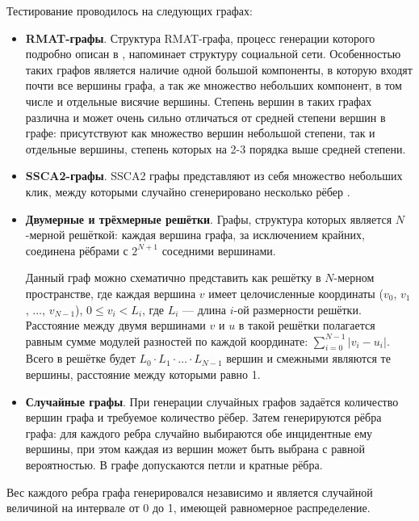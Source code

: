 \documentclass[a4paper,10pt]{extarticle}
\begin{document}
Тестирование проводилось на следующих графах:
\begin{itemize}
    \item \textbf{RMAT-графы}. Структура RMAT-графа, процесс генерации которого подробно описан в \cite{rmat-graph}, напоминает структуру социальной сети. Особенностью таких графов является наличие одной большой компоненты, в которую входят почти все вершины графа, а так же множество небольших компонент, в том числе и отдельные висячие вершины. Степень вершин в таких графах различна и может очень сильно отличаться от средней степени вершин в графе: присутствуют как множество вершин небольшой степени, так и отдельные вершины, степень которых на 2-3 порядка выше средней степени.
    
    \item \textbf{SSCA2-графы}. SSCA2 графы представляют из себя множество небольших клик, между которыми случайно сгенерировано несколько рёбер \cite{ssca2-graph}.
    
    \item \textbf{Двумерные и трёхмерные решётки}. Графы, структура которых является $N$-мерной решёткой: каждая вершина графа, за исключением крайних, соединена рёбрами с $2^{N+1}$ соседними вершинами.
    
    Данный граф можно схематично представить как решётку в $N$-мерном пространстве, где каждая вершина $v$ имеет целочисленные координаты ($v_0$, $v_1$, $\ldots$, $v_{N-1}$), $0 \leq v_i < L_i$, где $L_i$ --- длина $i$-ой размерности решётки. Расстояние между двумя вершинами $v$ и $u$ в такой решётки полагается равным сумме модулей разностей по каждой координате: $\displaystyle \sum_{i=0}^{N-1} |v_i - u_i|$. 
    Всего в решётке будет $L_0 \cdot L_1 \cdot \ldots \cdot L_{N-1}$ вершин и смежными являются те вершины, расстояние между которыми равно 1.
    
    \item \textbf{Случайные графы}. 
        При генерации случайных графов задаётся количество вершин графа и требуемое количество рёбер. Затем генерируются рёбра графа: для каждого ребра случайно выбираются обе инцидентные ему вершины, при этом каждая из вершин может быть выбрана с равной вероятностью. В графе допускаются петли и кратные рёбра.
\end{itemize}

Вес каждого ребра графа генерировался независимо и является случайной величиной на интервале от 0 до 1, имеющей равномерное распределение.
\end{document}

